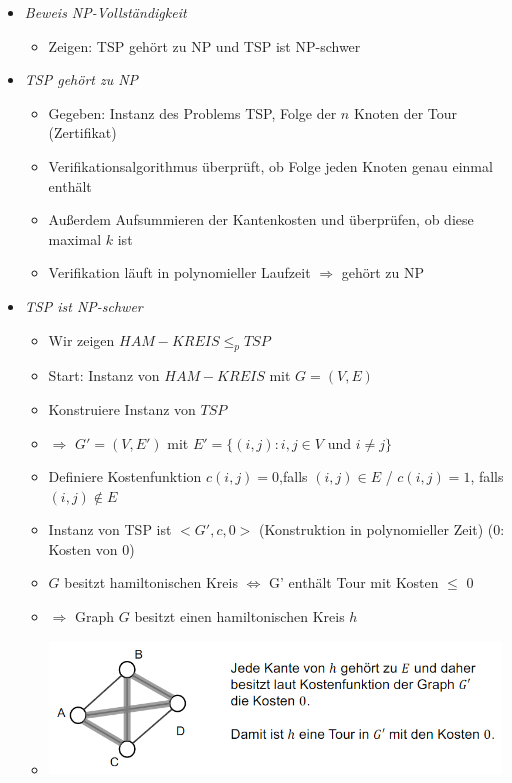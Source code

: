 \documentclass[
    12pt,
    a4paper,
    ngerman,
    color=3b,%
    marginpar=false,
    colorback=false,
    leqno,
]{tudaexercise}
\begin{document}
\begin{itemize}
\begin{itemize}
\begin{itemize}
                    \end{itemize}
              \item \textit{Beweis NP-Vollständigkeit}
                    \begin{itemize}
                        \item Zeigen: TSP gehört zu NP und TSP ist NP-schwer
                    \end{itemize}
              \item \textit{TSP gehört zu NP}
                    \begin{itemize}
                        \item Gegeben: Instanz des Problems TSP, Folge der $n$ Knoten der Tour (Zertifikat)
                        \item Verifikationsalgorithmus überprüft, ob Folge jeden Knoten genau einmal enthält
                        \item Außerdem Aufsummieren der Kantenkosten und überprüfen, ob diese maximal $k$ ist
                        \item Verifikation läuft in polynomieller Laufzeit $\Rightarrow$ gehört zu NP
                    \end{itemize}
                    \clearpage
              \item \textit{TSP ist NP-schwer}
                    \begin{itemize}
                        \item Wir zeigen $HAM-KREIS \leq_p TSP$
                        \item Start: Instanz von $HAM-KREIS$ mit $G=(V,E)$
                        \item Konstruiere Instanz von $TSP$
                        \item[] $\Rightarrow$ $G'=(V,E')$ mit $E'=\{(i,j):i,j \in V$ und $i\neq j\}$
                        \item Definiere Kostenfunktion $c(i,j) = 0$,falls $(i,j) \in E$ / $c(i,j)=1$, falls $(i,j) \notin E$
                        \item Instanz von TSP ist $<G', c, 0>$ (Konstruktion in polynomieller Zeit) (0: Kosten von 0)
                        \item {} $G$ besitzt hamiltonischen Kreis $\Leftrightarrow$ G' enthält Tour mit Kosten $\leq$ 0
                        \item $\Rightarrow$ Graph $G$ besitzt einen hamiltonischen Kreis $h$
                        \item[] \includegraphics[width=12cm]{pictures/schwer1.PNG}

\end{itemize}
\end{itemize}
\end{itemize}
\end{document}
